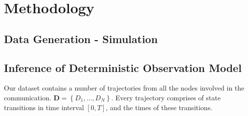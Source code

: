 \chapter{Methodology}


\section{Data Generation - Simulation}
\section{Inference of Deterministic Observation Model}
Our dataset contains a number of trajectories from all the nodes involved in the communication. $ \textbf{D} = \left\lbrace D_{1},..., D_{N}\right\rbrace $. Every trajectory comprises of state transitions in time interval $  [0, T] $, and the times of these transitions.
